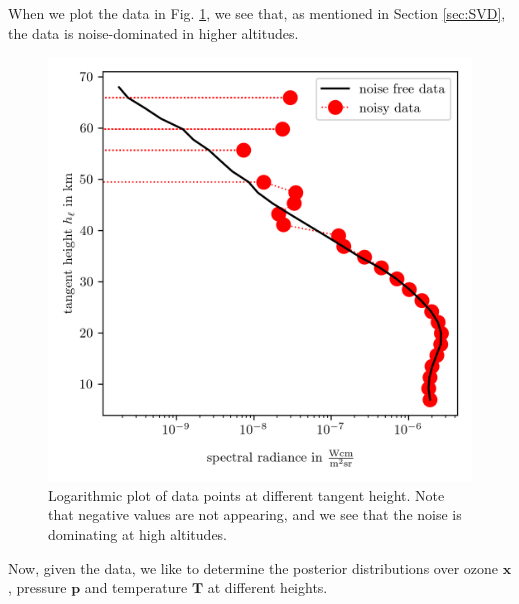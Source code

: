 When we plot the data in Fig. \ref{fig:DataPlot}, we see that, as mentioned in Section \ref{sec:SVD}, the data is noise-dominated in higher altitudes.
\begin{figure}[th!]
	\centering
	\includegraphics{DataPlot.png}
	\caption[Logarithmic plot of data points at different tangent height.]{Logarithmic plot of data points at different tangent height. Note that negative values are not appearing, and we see that the noise is dominating at high altitudes.}
	\label{fig:DataPlot}
\end{figure}
Now, given the data, we like to determine the posterior distributions over ozone $\bm{x}$, pressure $\bm{p}$ and temperature $\bm{T}$ at different heights.



